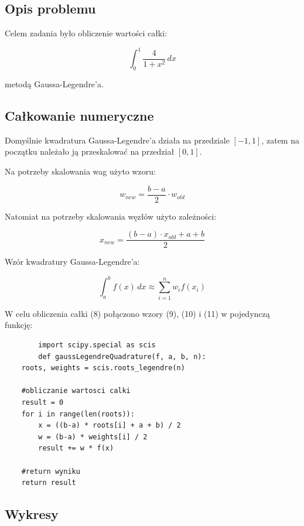 \documentclass{article}
\begin{document}
	\subsection*{Opis problemu}

	Celem zadania było obliczenie wartości całki:

	\begin{equation}
		\int_{0}^{1} \frac{4}{1 + x^2} \,dx 
	\end{equation}

	metodą Gaussa-Legendre'a.
	
	
	\subsection*{Całkowanie numeryczne}

	Domyślnie kwadratura Gaussa-Legendre'a działa na przedziale $[-1, 1]$, zatem na początku należało ją przeskalować na przedział $[0,1]$. 

	Na potrzeby skalowania wag użyto wzoru:

	\begin{equation}
		w_{new} = \frac{b - a}{2} \cdot w_{old}
	\end{equation}

	Natomiat na potrzeby skalowania węzłów użyto zależności:

	\begin{equation}
		x_{new} = \frac{(b - a) \cdot x_{old} + a + b}{2}
	\end{equation}

	Wzór kwadratury Gaussa-Legendre'a:

	\begin{equation}
		\int_{a}^{b} f(x) \,dx \approx \sum_{i=1}^{n} w_i f(x_i)
	\end{equation}

	W celu obliczenia całki (8) połączono wzory (9), (10) i (11) w pojedynczą funkcję:
	

	\begin{verbatim}
		import scipy.special as scis
		def gaussLegendreQuadrature(f, a, b, n):
    roots, weights = scis.roots_legendre(n)

    #obliczanie wartosci calki
    result = 0
    for i in range(len(roots)):
        x = ((b-a) * roots[i] + a + b) / 2
        w = (b-a) * weights[i] / 2
        result += w * f(x)
    
    #return wyniku
    return result
	\end{verbatim}

	\subsection*{Wykresy}
\end{document}
